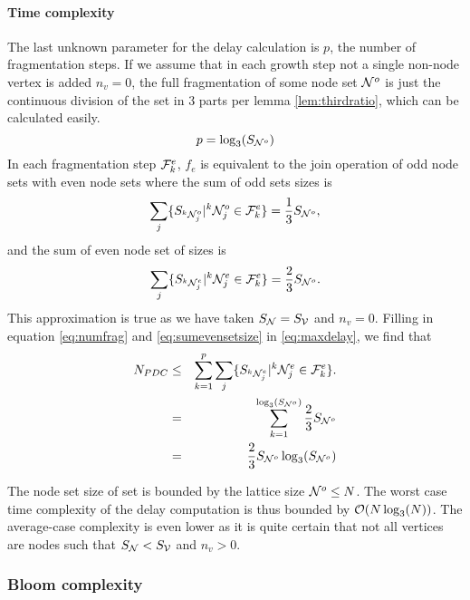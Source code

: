 \paragraph{Time complexity}
The last unknown parameter for the delay calculation is $p$, the number of fragmentation steps. If we assume that in each growth step not a single non-node vertex is added $n_v = 0$, the full fragmentation of some node set $\mathcal{N}^o$ is just the continuous division of the set in 3 parts per lemma \ref{lem:thirdratio}, which can be calculated easily.
\begin{equation}\label{eq:numfrag}
  p = \log_3(S_{\mathcal{N}^o})
\end{equation}
In each fragmentation step $\mathcal{F}^e_k$, $f_e$ is equivalent to the join operation of odd node sets with even node sets where the sum of odd sets sizes is
\begin{equation}\label{eq:sumoddsetsize}
  \sum_j \{ S_{{}^{k}\mathcal{N}_j^o} | {}^{k}\mathcal{N}_j^o \in \mathcal{F}^e_k \} = \frac{1}{3}S_{\mathcal{N}^o},
\end{equation}
and the sum of even node set of sizes is
\begin{equation}\label{eq:sumevensetsize}
  \sum_j \{ S_{{}^{k}\mathcal{N}_j^e} | {}^{k}\mathcal{N}_j^e \in \mathcal{F}^e_k \} = \frac{2}{3}S_{\mathcal{N}^o}.
\end{equation}
This approximation is true as we have taken $S_{\mathcal{N}} = S_{\mathcal{V}}$ and $n_v=0$. Filling in equation \eqref{eq:numfrag} and \eqref{eq:sumevensetsize} in \eqref{eq:maxdelay}, we find that
\begin{eqnarray}
\nonumber  N_{PDC} &\leq& \sum_{k=1}^{p} \sum_j \{ S_{{}^{k}\mathcal{N}_j^e} | {}^{k}\mathcal{N}_j^e \in \mathcal{F}^e_k \}. \\
\nonumber   &=& \sum_{k=1}^{\log_3(S_{\mathcal{N}^o})} \frac{2}{3}S_{\mathcal{N}^o} \\
   &=& \frac{2}{3}S_{\mathcal{N}^o}\log_3(S_{\mathcal{N}^o})
\end{eqnarray}

The node set size of set is bounded by the lattice size $\mathcal{N}^o \leq N$. The worst case time complexity of the delay computation is thus bounded by $\mathcal{O}(N\log_3(N))$. The average-case complexity is even lower as it is quite certain that not all vertices are nodes such that $S_{\mathcal{N}} < S_{\mathcal{V}}$ and $n_v > 0$.

\subsubsection{Bloom complexity}

